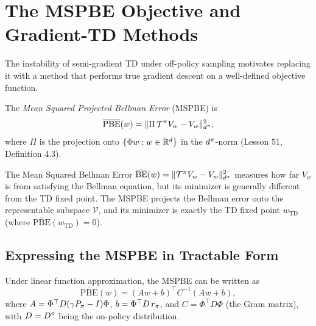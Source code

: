 \documentclass[11pt,a4paper]{article}
\begin{document}
\section{The MSPBE Objective and Gradient-TD Methods}
\label{sec:gtd}

The instability of semi-gradient TD under off-policy sampling
motivates replacing it with a method that performs true gradient
descent on a well-defined objective function.

\begin{definition}
\label{def:mspbe}
The \emph{Mean Squared Projected Bellman Error} (MSPBE) is
\begin{equation}
  \overline{\mathrm{PBE}}(w)
  = \|\Pi\,\mathcal{T}^\pi V_w - V_w\|_{d^\pi}^2,
  \label{eq:mspbe}
\end{equation}
where $\Pi$ is the projection onto $\{\Phi w : w \in \mathbb{R}^d\}$ in
the $d^\pi$-norm (Lesson 51, Definition 4.3).
\end{definition}

\begin{remark}
\label{rem:mspbe_vs_msbe}
The Mean Squared Bellman Error
$\overline{\mathrm{BE}}(w)
= \|\mathcal{T}^\pi V_w - V_w\|_{d^\pi}^2$ measures how far
$V_w$ is from satisfying the Bellman equation, but its minimizer is
generally different from the TD fixed point. The MSPBE projects the
Bellman error onto the representable subspace $\mathcal{V}$, and
its minimizer is exactly the TD fixed point $w_{\mathrm{TD}}$
(where $\overline{\mathrm{PBE}}(w_{\mathrm{TD}}) = 0$).
\end{remark}

\subsection{Expressing the MSPBE in Tractable Form}
\label{subsec:mspbe_form}

\begin{proposition}
\label{prop:mspbe_quadratic}
Under linear function approximation, the MSPBE can be written as
\begin{equation}
  \overline{\mathrm{PBE}}(w) = (Aw + b)^\top C^{-1}(Aw + b),
  \label{eq:mspbe_quadratic}
\end{equation}
where $A = \Phi^\top D(\gamma P_\pi - I)\Phi$,
$b = \Phi^\top D\, r_\pi$, and $C = \Phi^\top D\Phi$ (the Gram
matrix), with $D = D^\pi$ being the on-policy distribution.
\end{proposition}
\end{document}
